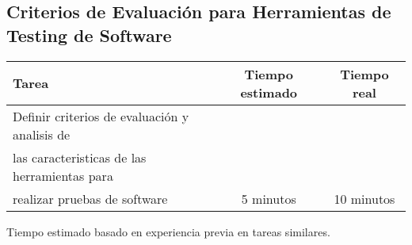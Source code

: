 \documentclass[12pt,a4paper]{article}
\begin{document}
\subsection{Criterios de Evaluación para Herramientas de Testing de Software}
    \begin{center}
        \begin{tabular}{|l|c|c|}
            \hline
            \textbf{Tarea} & \textbf{Tiempo estimado} & \textbf{Tiempo real} \\
            \hline
            Definir criterios de evaluación y analisis de
\\las caracteristicas de las herramientas para 
\\realizar pruebas de software & 5 minutos & 10 minutos \\
            \hline
        \end{tabular}
    \end{center}
    \begin{center}
        Tiempo estimado basado en experiencia previa en tareas similares.
    \end{center}
\end{document}
